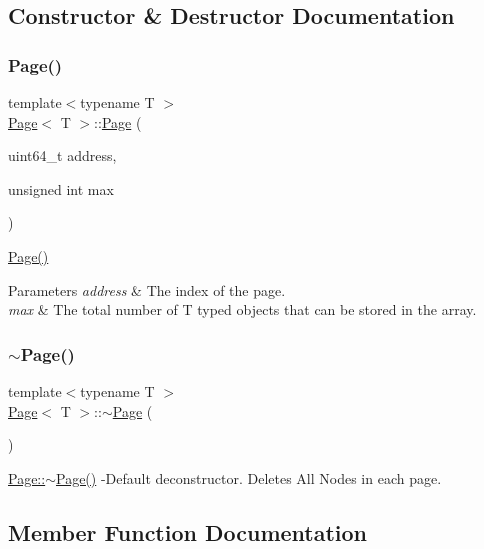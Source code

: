 \subsection{Constructor \& Destructor Documentation}
\mbox{\label{class_page_ac9e22e2694dfa6a7dc4f80166c0217c5}} 
\subsubsection{\texorpdfstring{Page()}{Page()}}
{\footnotesize\ttfamily template$<$typename T $>$ \\
\hyperlink{class_page}{Page}$<$ T $>$\+::\hyperlink{class_page}{Page} (\begin{DoxyParamCaption}\item[{uint64\+\_\+t}]{address,  }\item[{unsigned int}]{max }\end{DoxyParamCaption})}

\hyperlink{class_page_ac9e22e2694dfa6a7dc4f80166c0217c5}{Page()} 
\begin{DoxyParams}{Parameters}
{\em address} & The index of the page. \\
\hline
{\em max} & The total number of T typed objects that can be stored in the array. \\
\hline
\end{DoxyParams}
\mbox{\label{class_page_a7312a131c7f52718cf4f2b6f487d31bf}} 
\subsubsection{\texorpdfstring{$\sim$\+Page()}{~Page()}}
{\footnotesize\ttfamily template$<$typename T $>$ \\
\hyperlink{class_page}{Page}$<$ T $>$\+::$\sim$\hyperlink{class_page}{Page} (\begin{DoxyParamCaption}{ }\end{DoxyParamCaption})}

\hyperlink{class_page_a7312a131c7f52718cf4f2b6f487d31bf}{Page\+::$\sim$\+Page()} -\/\+Default deconstructor. Deletes All Nodes in each page. 

\subsection{Member Function Documentation}
\mbox{\label{class_page_af540699e2f459eccb3a4991c0b509bce}} 
